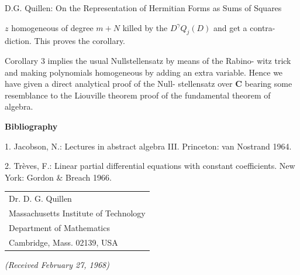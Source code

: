  D.G. Quillen: On the Representation of Hermitian Forms as Sums of Squares

$z$ homogeneous of degree $m+N$ killed by the $D^\gamma Q_j(D)$ and get a contra-%
diction. This proves the corollary.

Corollary 3 implies the usual Nullstellensatz by means of the Rabino-%
witz trick and making polynomials homogeneous by adding an extra
variable. Hence we have given a direct analytical proof of the Null-%
stellensatz over $\mathbf{C}$ bearing some resemblance to the Liouville theorem
proof of the fundamental theorem of algebra.

\begin{center}
\textbf{Bibliography}
\end{center}

1. Jacobson, N.: Lectures in abstract algebra III. Princeton: van Nostrand 1964.

2. Trèves, F.: Linear partial differential equations with constant coefficients. New York:
Gordon \& Breach 1966.

\begin{flushright}
\begin{tabular}{l}
Dr. D. G. Quillen\\
Massachusetts Institute of Technology\\
Department of Mathematics\\
Cambridge, Mass. 02139, USA
\end{tabular}
\end{flushright}

\begin{center}
\textit{(Received February 27, 1968)}
\end{center}

